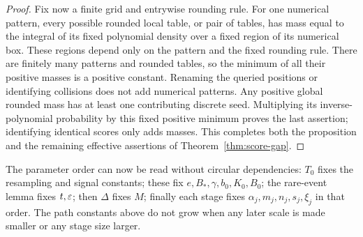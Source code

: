 \begin{proof}
Fix now a finite grid and entrywise rounding rule. For one numerical pattern,
every possible rounded local table, or pair of tables, has mass equal
to the integral of its fixed polynomial density over a fixed region
of its numerical box. These regions depend only on the pattern and
the fixed rounding rule. There are finitely many patterns and rounded
tables, so the minimum of all their positive masses is a positive
constant. Renaming the queried positions or identifying collisions
does not add numerical patterns. Any positive global rounded mass has
at least one contributing discrete seed. Multiplying its
inverse-polynomial probability by this fixed positive minimum proves
the last assertion; identifying identical scores only adds masses.
This completes both the proposition and the remaining effective assertions of
Theorem~\ref{thm:score-gap}.
\end{proof}

The parameter order can now be read without circular dependencies:
$T_0$ fixes the resampling and signal constants; these fix
$e,B_*,\gamma,b_0,K_0,B_0$; the rare-event lemma fixes $t,\varepsilon$;
then $\Delta$ fixes $M$; finally each stage fixes
$\alpha_j,m_j,n_j,s_j,\xi_j$ in that order. The path constants above
do not grow when any later scale is made smaller or any stage size
larger.
